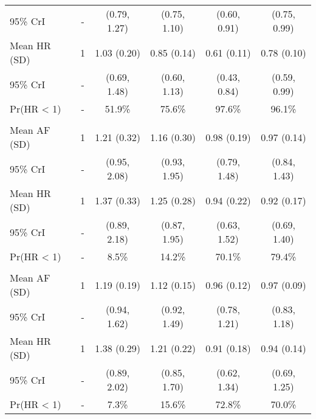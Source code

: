 \documentclass[nutrients,article,submitted,moreauthors,pdftex]{Definitions/mdpi}
\begin{document}
\begin{table}[H]
{\begin{tabular}[t]{lccccc}
\rowcolor{gray!6}  \hspace{1em}95\% CrI & - & (0.79, 1.27) & (0.75, 1.10) & (0.60, 0.91) & (0.75, 0.99)\\
\hspace{1em}Mean HR (SD) & 1 & 1.03 (0.20) & 0.85 (0.14) & 0.61 (0.11) & 0.78 (0.10)\\
\rowcolor{gray!6}  \hspace{1em}95\% CrI & - & (0.69, 1.48) & (0.60, 1.13) & (0.43, 0.84) & (0.59, 0.99)\\
\hspace{1em}Pr(HR < 1) & - & 51.9\% & 75.6\% & 97.6\% & 96.1\%\\
\addlinespace[0.3em]
\multicolumn{6}{l}{\textbf{Model 1}}\\
\rowcolor{gray!6}  \hspace{1em}Mean AF (SD) & 1 & 1.21 (0.32) & 1.16 (0.30) & 0.98 (0.19) & 0.97 (0.14)\\
\hspace{1em}95\% CrI & - & (0.95, 2.08) & (0.93, 1.95) & (0.79, 1.48) & (0.84, 1.43)\\
\rowcolor{gray!6}  \hspace{1em}Mean HR (SD) & 1 & 1.37 (0.33) & 1.25 (0.28) & 0.94 (0.22) & 0.92 (0.17)\\
\hspace{1em}95\% CrI & - & (0.89, 2.18) & (0.87, 1.95) & (0.63, 1.52) & (0.69, 1.40)\\
\rowcolor{gray!6}  \hspace{1em}Pr(HR < 1) & - & 8.5\% & 14.2\% & 70.1\% & 79.4\%\\
\addlinespace[0.3em]
\multicolumn{6}{l}{\textbf{Model 2}}\\
\hspace{1em}Mean AF (SD) & 1 & 1.19 (0.19) & 1.12 (0.15) & 0.96 (0.12) & 0.97 (0.09)\\
\rowcolor{gray!6}  \hspace{1em}95\% CrI & - & (0.94, 1.62) & (0.92, 1.49) & (0.78, 1.21) & (0.83, 1.18)\\
\hspace{1em}Mean HR (SD) & 1 & 1.38 (0.29) & 1.21 (0.22) & 0.91 (0.18) & 0.94 (0.14)\\
\rowcolor{gray!6}  \hspace{1em}95\% CrI & - & (0.89, 2.02) & (0.85, 1.70) & (0.62, 1.34) & (0.69, 1.25)\\
\hspace{1em}Pr(HR < 1) & - & 7.3\% & 15.6\% & 72.8\% & 70.0\%\\

\end{tabular}}
\end{table}
\end{document}
